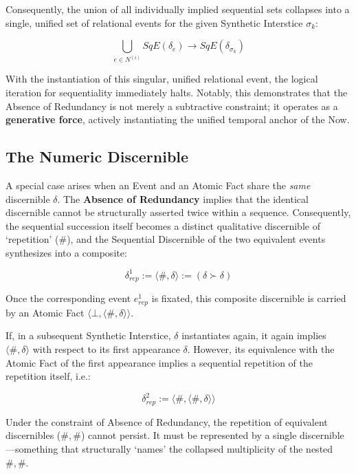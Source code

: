 \documentclass[11pt, a4paper]{article}
\theoremstyle{formalism}
\begin{document}
Consequently, the union of all individually implied sequential sets collapses 
into a single, unified set of relational events for the given Synthetic 
Interstice $\sigma_k$:

\begin{equation}
    \bigcup_{e \in N^{(i)}} SqE(\delta_e) \longrightarrow SqE(\delta_{\sigma_k})
\end{equation}

With the instantiation of this singular, unified relational event, the logical 
iteration for sequentiality immediately halts. Notably, this demonstrates that 
the Absence of Redundancy is not merely a subtractive constraint; it operates 
as a \textbf{generative force}, actively instantiating the unified temporal 
anchor of the Now.

\subsection{The Numeric Discernible}

A special case arises when an Event and an Atomic Fact share the \textit{same} 
discernible $\delta$. The \textbf{Absence of Redundancy} implies that the identical 
discernible cannot be structurally asserted twice within a sequence. Consequently, 
the sequential succession itself becomes a distinct qualitative discernible of 
`repetition' ($\#$), and the Sequential Discernible of the two equivalent events 
synthesizes into a composite:

\begin{equation}
    \delta^1_{rep} := \langle \#, \delta \rangle := (\delta \succ \delta)
\end{equation}

Once the corresponding event $e^1_{rep}$ is fixated, this composite discernible 
is carried by an Atomic Fact $\langle \bot, \langle \#, \delta \rangle \rangle$. 

If, in a subsequent Synthetic Interstice, $\delta$ instantiates again, it again 
implies $\langle \#, \delta \rangle$ with respect to its first appearance $\delta$. 
However, its equivalence with the Atomic Fact of the first appearance implies a 
sequential repetition of the repetition itself, i.e.:

\begin{equation}
    \delta^2_{rep} := \langle \#, \langle \#, \delta \rangle \rangle
\end{equation}

Under the constraint of Absence of Redundancy, the repetition of equivalent
discernibles ($\#, \#$) cannot persist. It must be represented by a single
discernible---something that structurally `names' the collapsed multiplicity of
the nested $\#, \#$. 
\end{document}
